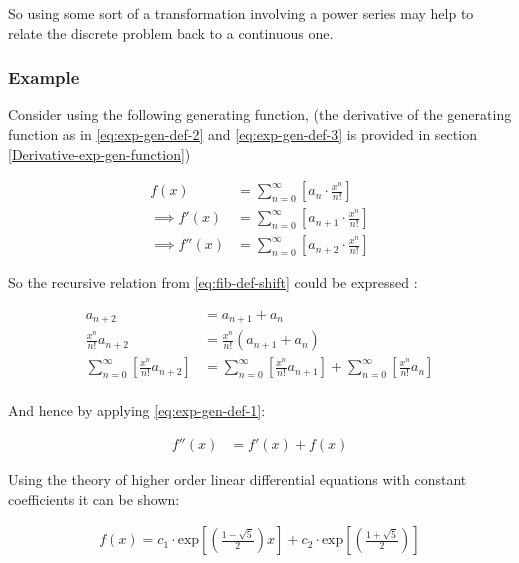 \documentclass[11pt]{article}
\begin{document}
So using some sort of a transformation involving a power series may help to
relate the discrete problem back to a continuous one.

\subsubsection{Example}
\label{solving-the-sequence}
Consider using the following generating function, (the derivative of the
generating function as in \eqref{eq:exp-gen-def-2} and \eqref{eq:exp-gen-def-3} is
provided in section \ref{Derivative-exp-gen-function})




\begin{align}
    f\left( x \right) &=  \sum^{\infty}_{n= 0}   \left[ a_{n} \cdot  \frac{x^n}{n!} \right]   \label{eq:exp-gen-def-1} \\
 \implies   f'\left( x \right) &=  \sum^{\infty}_{n= 0}   \left[ a_{n+1} \cdot  \frac{x^n}{n!} \right]   \label{eq:exp-gen-def-2} \\
\implies    f''\left( x \right) &=  \sum^{\infty}_{n= 0}   \left[ a_{n+2} \cdot  \frac{x^n}{n!} \right]   \label{eq:exp-gen-def-3}
\end{align}


So the recursive relation from \eqref{eq:fib-def-shift}  could be expressed :


\begin{align*}
a_{n+  2}    &= a_{n+  1} +  a_{n}\\
\frac{x^n}{n!}   a_{n+  2}    &= \frac{x^n}{n!}\left( a_{n+  1} +  a_{n}  \right)\\
\sum^{\infty}_{n= 0} \left[ \frac{x^n}{n!}   a_{n+  2} \right]        &= \sum^{\infty}_{n= 0}   \left[ \frac{x^n}{n!} a_{n+  1} \right]  + \sum^{\infty}_{n= 0}   \left[ \frac{x^n}{n!} a_{n}  \right]  \\
\end{align*}

And hence by applying \eqref{eq:exp-gen-def-1}:

\begin{align}
f''\left( x \right) &= f'\left( x \right)+  f\left( x \right)
\end{align}


Using the theory of higher order linear differential equations with
constant coefficients it can be shown:


\begin{align*}
f\left( x \right)= c_1 \cdot  \mathrm{exp}\left[ \left( \frac{1- \sqrt{5} }{2} \right)x \right] +  c_2 \cdot  \mathrm{exp}\left[ \left( \frac{1 +  \sqrt{5} }{2} \right) \right]
\end{align*}
\end{document}
